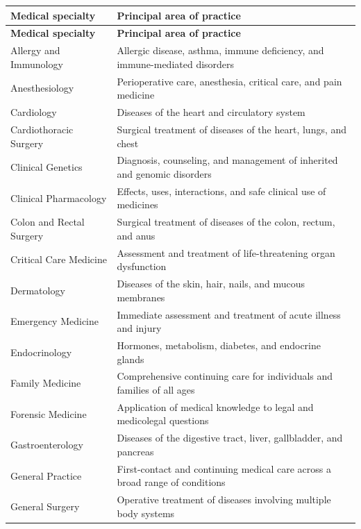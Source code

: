 \small
\setlength{\LTleft}{0pt}
\setlength{\LTright}{0pt}
\begin{longtable}{>{\raggedright\arraybackslash}p{} >{\raggedright\arraybackslash}p{}}
\toprule
\textbf{Medical specialty} & \textbf{Principal area of practice} \\
\midrule
\endfirsthead
\toprule
\textbf{Medical specialty} & \textbf{Principal area of practice} \\
\midrule
\endhead
\bottomrule
\endfoot

Allergy and Immunology & Allergic disease, asthma, immune deficiency, and immune-mediated disorders \\
Anesthesiology & Perioperative care, anesthesia, critical care, and pain medicine \\
Cardiology & Diseases of the heart and circulatory system \\
Cardiothoracic Surgery & Surgical treatment of diseases of the heart, lungs, and chest \\
Clinical Genetics & Diagnosis, counseling, and management of inherited and genomic disorders \\
Clinical Pharmacology & Effects, uses, interactions, and safe clinical use of medicines \\
Colon and Rectal Surgery & Surgical treatment of diseases of the colon, rectum, and anus \\
Critical Care Medicine & Assessment and treatment of life-threatening organ dysfunction \\
Dermatology & Diseases of the skin, hair, nails, and mucous membranes \\
Emergency Medicine & Immediate assessment and treatment of acute illness and injury \\
Endocrinology & Hormones, metabolism, diabetes, and endocrine glands \\
Family Medicine & Comprehensive continuing care for individuals and families of all ages \\
Forensic Medicine & Application of medical knowledge to legal and medicolegal questions \\
Gastroenterology & Diseases of the digestive tract, liver, gallbladder, and pancreas \\
General Practice & First-contact and continuing medical care across a broad range of conditions \\
General Surgery & Operative treatment of diseases involving multiple body systems \\

\end{longtable}
